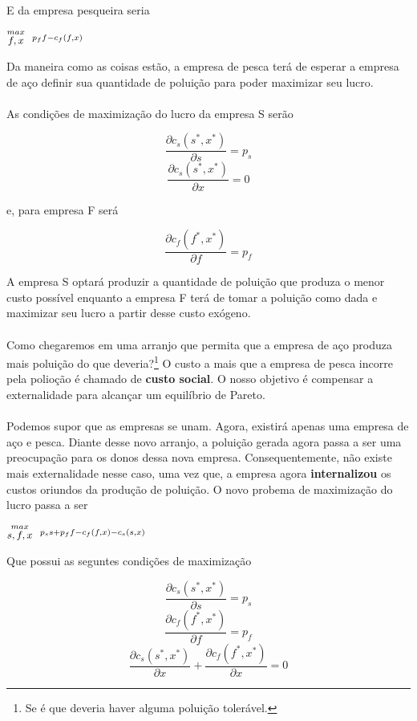 \documentclass[a4paper,11pt,oneside]{book}
\theoremstyle{definition}
\theoremstyle{break}
\begin{document}
E da empresa pesqueira seria

\begin{center}
	\LARGE $ \stackrel{max}{\text{\small $f,x$}} \ \ %
	\stackrel{p_f f - c_f(f,x)}{\ } $ %
\end{center}

Da maneira como as coisas estão, a empresa de pesca terá de esperar a empresa de aço definir sua quantidade de poluição para poder maximizar seu lucro.
\\~\\
As condições de maximização do lucro da empresa S serão

$$ \frac{\partial c_s(s^*,x^*)}{\partial s} = p_s $$
$$ \frac{\partial c_s(s^*,x^*)}{\partial x} = 0 $$

e, para empresa F será

$$ \frac{\partial c_f(f^*,x^*)}{\partial f} = p_f $$

A empresa S optará produzir a quantidade de poluição que produza o menor custo possível enquanto a empresa F terá de tomar a poluição como dada e maximizar seu lucro a partir desse custo exógeno.
\\~\\
Como chegaremos em uma arranjo que permita que a empresa de aço produza mais poluição do que deveria?\footnote{Se é que deveria haver alguma poluição tolerável.} O custo a mais que a empresa de pesca incorre pela polioção é chamado de \textbf{custo social}. O nosso objetivo é compensar a externalidade para alcançar um equilíbrio de Pareto.
\\~\\
Podemos supor que as empresas se unam. Agora, existirá apenas uma empresa de aço e pesca. Diante desse novo arranjo, a poluição gerada agora passa a ser uma preocupação para os donos dessa nova empresa. Consequentemente, não existe mais externalidade nesse caso, uma vez que, a empresa agora \textbf{internalizou} os custos oriundos da produção de poluição. O novo probema de maximização do lucro passa a ser

\begin{center}
	\LARGE $ \stackrel{max}{\text{\small $s,f,x$}} \ \ %
	\stackrel{p_s s + p_f f - c_f(f,x) - c_s(s,x)}{\ } $ %
\end{center}

Que possui as seguntes condições de maximização

$$ \frac{\partial c_s(s^*,x^*)}{\partial s} = p_s $$
$$ \frac{\partial c_f(f^*,x^*)}{\partial f} = p_f $$
$$ \frac{\partial c_s(s^*,x^*)}{\partial x} + \frac{\partial c_f(f^*,x^*)}{\partial x}= 0 $$
\end{document}
